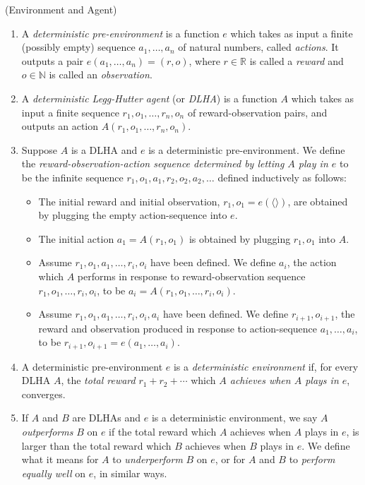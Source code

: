 \documentclass[twoside,11pt]{article}
\begin{document}
\begin{definition}
\label{EnvironmentAndAgent}
    (Environment and Agent)
    \begin{enumerate}
        \item
        A \emph{deterministic pre-environment} is a function $e$ which takes as input a finite
        (possibly empty) sequence
        $a_1,\ldots,a_n$ of
        natural numbers, called \emph{actions}. It outputs a pair 
        $e(a_1,\ldots,a_n)=(r,o)$, where $r\in\mathbb R$ is called a \emph{reward}
        and $o\in\mathbb N$ is called an \emph{observation}.
        \item
        A \emph{deterministic Legg-Hutter agent} (or \emph{DLHA}) is
        a function $A$ which takes as input a finite sequence
        $r_1,o_1,\ldots,r_n,o_n$ of reward-observation pairs, and outputs an action
        $A(r_1,o_1,\ldots,r_n,o_n)$.
        \item
        Suppose $A$ is a DLHA and $e$ is a deterministic pre-environment.
        We define the \emph{reward-observation-action sequence
        determined by letting $A$ play in $e$} to be the infinite sequence
        $r_1,o_1,a_1,r_2,o_2,a_2,\ldots$ defined inductively as follows:
        \begin{itemize}
            \item
            The initial reward and initial observation,
            $r_1,o_1=e(\langle\rangle)$, are obtained by plugging the empty
            action-sequence into $e$.
            \item
            The initial action
            $a_1=A(r_1,o_1)$ is obtained by plugging $r_1,o_1$ into $A$.
            \item
            Assume $r_1,o_1,a_1,\ldots,r_i,o_i$ have been defined.
            We define $a_i$,
            the action which $A$ performs
            in response to reward-observation sequence $r_1,o_1,\ldots,r_i,o_i$,
            to be $a_i=A(r_1,o_1,\ldots,r_i,o_i)$.
            \item
            Assume $r_1,o_1,a_1,\ldots,r_i,o_i,a_i$ have been defined.
            We define $r_{i+1},o_{i+1}$, the reward and observation
            produced in response to action-sequence $a_1,\ldots,a_i$,
            to be $r_{i+1},o_{i+1}=e(a_1,\ldots,a_i)$.
        \end{itemize}
        \item
        A deterministic pre-environment $e$ is a \emph{deterministic environment} if,
        for every DLHA $A$, the \emph{total reward} $r_1+r_2+\cdots$
        which \emph{$A$ achieves
        when $A$ plays in $e$}, converges.
        \item
        If $A$ and $B$ are DLHAs and $e$ is a deterministic environment, we
        say $A$ \emph{outperforms}
        $B$ on $e$ if the total reward which $A$ achieves when $A$ plays in $e$, is larger than
        the total reward which $B$ achieves when $B$ plays in $e$.
        We define what it means for
        $A$ to \emph{underperform} $B$ on $e$, or for $A$ and $B$
        to \emph{perform equally well}
        on $e$, in similar ways.
    \end{enumerate}
\end{definition}
\end{document}
